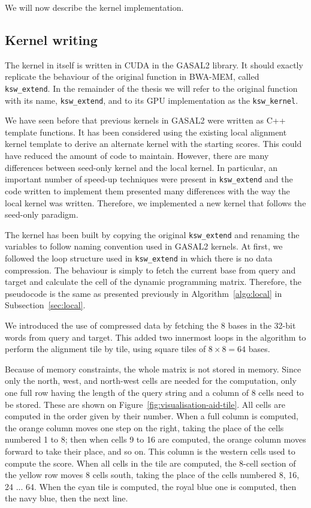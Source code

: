 We will now describe the kernel implementation.

\subsection{Kernel writing}
The kernel in itself is written in CUDA in the GASAL2 library. It should exactly replicate the behaviour of the original function in BWA-MEM, called \verb|ksw_extend|. In the remainder of the thesis we will refer to the original function with its name, \verb|ksw_extend|, and to its GPU implementation as the \verb|ksw_kernel|.

We have seen before that previous kernels in GASAL2 were written as C++ template functions. It has been considered using the existing local alignment kernel template to derive an alternate kernel with the starting scores. This could have reduced the amount of code to maintain. However, there are many differences between seed-only kernel and the local kernel. In particular, an important number of speed-up techniques were present in \verb|ksw_extend| and the code written to implement them presented many differences with the way the local kernel was written. Therefore, we implemented a new kernel that follows the seed-only paradigm.

The kernel has been built by copying the original \verb|ksw_extend| and renaming the variables to follow naming convention used in GASAL2 kernels. At first, we followed the loop structure used in \verb|ksw_extend| in which there is no data compression. The behaviour is simply to fetch the current base from query and target and calculate the cell of the dynamic programming matrix. Therefore, the pseudocode is the same as presented previously in Algorithm~\ref{algo:local} in Subsection~\ref{sec:local}.

We introduced the use of compressed data by fetching the 8 bases in the 32-bit words from query and target. This added two innermost loops in the algorithm to perform the alignment tile by tile, using square tiles of $8 \times 8 = 64$ bases.

Because of memory constraints, the whole matrix is not stored in memory. Since only the north, west, and north-west cells are needed for the computation, only one full row having the length of the query string and a column of 8 cells need to be stored. These are shown on Figure~\ref{fig:visualisation-aid-tile}. All cells are computed in the order given by their number. When a full column is computed, the orange column moves one step on the right, taking the place of the cells numbered 1 to 8; then when cells 9 to 16 are computed, the orange column moves forward to take their place, and so on. This column is the western cells used to compute the score. When all cells in the tile are computed, the 8-cell section of the yellow row moves 8 cells south, taking the place of the cells numbered 8, 16, 24 ... 64. When the cyan tile is computed, the royal blue one is computed, then the navy blue, then the next line.

